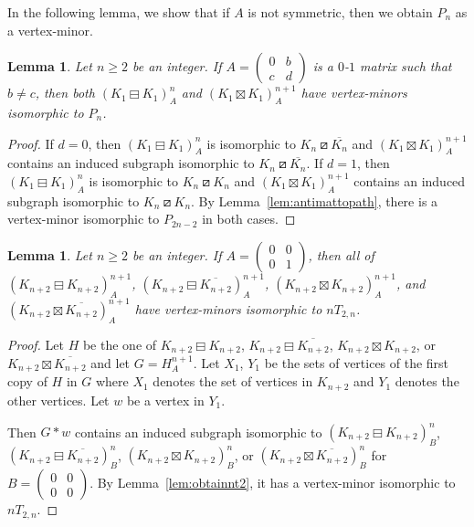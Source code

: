 \documentclass[11pt]{article}
\newtheorem{lemma}[theorem]{Lemma}
\newcommand\mat{\boxminus}
\newcommand\tri{\boxslash}
\newcommand\antimat{\boxtimes}
\def\K_#1{{K_{#1}}}
\def\S_#1{\overline{K_{#1}}}
\begin{document}
In the following lemma, 
  we 
  show that
  if $A$ is not symmetric, then we obtain $P_n$ as a vertex-minor.
\begin{lemma}\label{lem:notsymmetric}
  Let $n\ge 2$ be an integer.
  If $A=(
  \begin{smallmatrix}
    0 & b \\c&d
  \end{smallmatrix})$
  is a $0$-$1$ matrix such that $b\neq c$,
  then 
  both $(\K_{1}\mat \K_{1})^n_A$
  and
  $(\K_{1}\antimat \K_{1})^{n+1}_A$
  have vertex-minors isomorphic to $P_{n}$.
\end{lemma}
\begin{proof}
  If $d=0$, then $(\K_{1}\mat \K_{1})^n_A$ is isomorphic to $K_n\tri \S_n$
  and $(K_{1}\antimat K_{1})^{n+1}_A$ contains an induced subgraph
  isomorphic to $K_n\tri \S_n$.
  If $d=1$, then  $(\K_{1}\mat \K_{1})^{n}_A$ is isomorphic to $K_n\tri \K_n$
  and $(\K_{1}\antimat \K_{1})^{n+1}_A$  contains an induced subgraph
  isomorphic to $K_n\tri \K_n$.
  By Lemma~\ref{lem:antimattopath}, there is a vertex-minor isomorphic to $P_{2n-2}$ in both cases. 
\end{proof}

	

\begin{lemma}\label{lem:simpledcm2}
  Let $n\ge 2$  be an integer.
  If $A=(
  \begin{smallmatrix}
    0 & 0\\
    0 &1 
  \end{smallmatrix}
  )$, then
  all of $(K_{n+2}\mat K_{n+2})^{n+1}_A$,
  $(K_{n+2}\mat \S_{n+2})^{n+1}_A$,
  $(K_{n+2}\antimat K_{n+2})^{n+1}_A$,
  and 
  $(K_{n+2}\antimat \S_{n+2})^{n+1}_A$
  have vertex-minors isomorphic to $nT_{2,n}$.
	\end{lemma}
	\begin{proof}
          Let $H$ be the one of   $K_{n+2}\mat K_{n+2}$,
          $K_{n+2}\mat \S_{n+2}$,
          $K_{n+2}\antimat K_{n+2}$,
          or
          $K_{n+2}\antimat \S_{n+2}$
          and let $G=H^{n+1}_A$.
          Let $X_1$, $Y_1$ be the sets of vertices of the first copy of $H$ in $G$
          where $X_1$ denotes the set of vertices in $K_{n+2}$
          and $Y_1$ denotes the other vertices.
          Let $w$ be a vertex in $Y_1$.
          
          Then $G*w$ contains an induced subgraph isomorphic to
          $(K_{n+2}\mat K_{n+2})^{n}_B$,
          $(K_{n+2}\mat \S_{n+2})^{n}_B$,
          $(K_{n+2}\antimat K_{n+2})^{n}_B$,
          or 
          $(K_{n+2}\antimat \S_{n+2})^{n}_B$
          for $B=(
          \begin{smallmatrix}
            0&0\\0&0
          \end{smallmatrix})$.
          By Lemma~\ref{lem:obtainnt2}, it has a vertex-minor isomorphic to
          $nT_{2,n}$.
	\end{proof}
	
\end{document}
